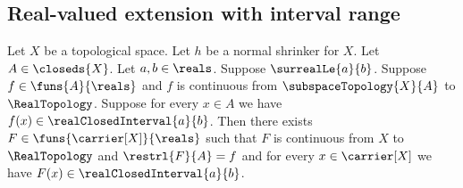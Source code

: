 \subsection{Real-valued extension with interval range}

\begin{theorem}\label{tietze_extension_closed_interval_real_from_normal_shrinker}
    Let $X$ be a topological space.
    Let $h$ be a normal shrinker for $X$.
    Let $A\in\closeds{X}$.
    Let $a,b\in\reals$.
    Suppose $\surrealLe{a}{b}$.
    Suppose $f\in\funs{A}{\reals}$ and $f$ is continuous from
        $\subspaceTopology{X}{A}$ to $\RealTopology$.
    Suppose for every $x\in A$ we have
        $f(x)\in\realClosedInterval{a}{b}$.
    Then there exists $F\in\funs{\carrier[X]}{\reals}$ such that
        $F$ is continuous from $X$ to $\RealTopology$ and
        $\restrl{F}{A}=f$ and
        for every $x\in\carrier[X]$ we have
            $F(x)\in\realClosedInterval{a}{b}$.
\end{theorem}
